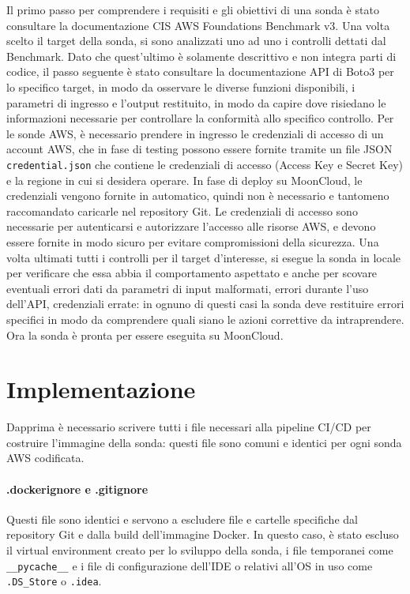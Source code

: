\vspace{2em}

Il primo passo per comprendere i requisiti e gli obiettivi di una sonda è stato consultare la documentazione CIS AWS Foundations Benchmark v3. Una volta scelto il target della sonda, si sono analizzati uno ad uno i controlli dettati dal Benchmark. Dato che quest'ultimo è solamente descrittivo e non integra parti di codice, il passo seguente è stato consultare la documentazione API di Boto3 per lo specifico target, in modo da osservare le diverse funzioni disponibili, i parametri di ingresso e l'output restituito, in modo da capire dove risiedano le informazioni necessarie per controllare la conformità allo specifico controllo.
Per le sonde AWS, è necessario prendere in ingresso le credenziali di accesso di un account AWS, che in fase di testing possono essere fornite tramite un file JSON \texttt{credential.json} che contiene le credenziali di accesso (Access Key e Secret Key) e la regione in cui si desidera operare. In fase di deploy su MoonCloud, le credenziali vengono fornite in automatico, quindi non è necessario e tantomeno raccomandato caricarle nel repository Git. Le credenziali di accesso sono necessarie per autenticarsi e autorizzare l'accesso alle risorse AWS, e devono essere fornite in modo sicuro per evitare compromissioni della sicurezza.
Una volta ultimati tutti i controlli per il target d'interesse, si esegue la sonda in locale per verificare che essa abbia il comportamento aspettato e anche per scovare eventuali errori dati da parametri di input malformati, errori durante l'uso dell'API, credenziali errate: in ognuno di questi casi la sonda deve restituire errori specifici in modo da comprendere quali siano le azioni correttive da intraprendere. Ora la sonda è pronta per essere eseguita su MoonCloud.

\section{Implementazione}
\label{sec:implementazione}

Dapprima è necessario scrivere tutti i file necessari alla pipeline CI/CD per costruire l'immagine della sonda: questi file sono comuni e identici per ogni sonda AWS codificata.

\paragraph{.dockerignore e .gitignore} Questi file sono identici e servono a escludere file e cartelle specifiche dal repository Git e dalla build dell'immagine Docker. In questo caso, è stato escluso il virtual environment creato per lo sviluppo della sonda, i file temporanei come \texttt{\_\_pycache\_\_} e i file di configurazione dell'IDE o relativi all'OS in uso come \texttt{.DS\_Store} o \texttt{.idea}. 

